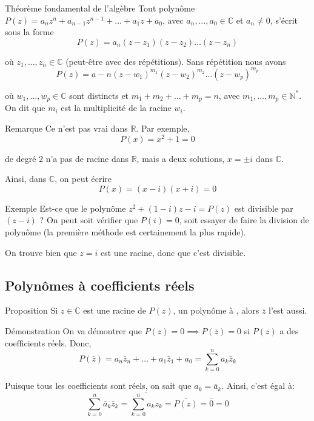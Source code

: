 \documentclass[a4paper]{article}
\begin{document}
\begin{parag}{Théorème fondamental de l'algèbre}
    Tout polynôme $P\left(z\right) = a_n z^n + a_{n - 1} z^{n-1} + \ldots + a_1 z + a_0$, avec $a_n, \ldots, a_0 \in \mathbb{C}$ et $a_n \neq 0$, s'écrit sous la forme
    \[P\left(z\right) = a_n \left(z - z_1\right)\left(z - z_2\right)\ldots\left(z - z_n\right)\]

    où $z_1, \ldots, z_n \in \mathbb{C}$ (peut-être avec des répétitions). Sans répétition nous avons
    \[P\left(z\right) = a-n \left(z - w_1\right)^{m_1} \left(z - w_2\right)^{m_2}\ldots\left(z - w_p\right)^{m_p}\]

    où $w_1, \ldots, w_p \in \mathbb{C}$ sont distincts et $m_1 + m_2 + \ldots + m_p = n$, avec $m_1, \ldots, m_p \in \mathbb{N}^*$. On dit que $m_i$ est la multiplicité de la racine $w_i$.

    \begin{subparag}{Remarque}
        Ce n'est pas vrai dans $\mathbb{R}$. Par exemple,
        \[P\left(x\right) = x^2 + 1 = 0\]

        de degré 2 n'a pas de racine dans $\mathbb{R}$, mais a deux solutions, $x = \pm i$ dans $\mathbb{C}$.

        Ainsi, dans $\mathbb{C}$, on peut écrire
        \[P\left(x\right) = \left(x - i\right)\left(x + i\right) = 0\]
    \end{subparag}
\end{parag}

\begin{parag}{Exemple}
    Est-ce que le polynôme $z^2 + \left(1- i\right)z - i = P\left(z\right)$ est divisible par $\left(z - i\right)$ ? On peut soit vérifier que $P\left(i\right) = 0$, soit essayer de faire la division de polynôme (la première méthode est certainement la plus rapide).

    On trouve bien que $z = i$ est une racine, donc que c'est divisible.
\end{parag}

\subsection{Polynômes à coefficients réels}
\begin{parag}{Proposition}
    Si $z \in \mathbb{C}$ est une racine de $P\left(z\right)$, un polynôme à , alors $\bar{z}$ l'est aussi.

    \begin{subparag}{Démonstration}
        On va démontrer que $P\left(z\right) = 0 \implies P\left(\bar{z}\right) = 0$ si $P\left(z\right)$ a des coefficients réels. Donc,
        \[P\left(\bar{z}\right) = a_n \bar{z}_n + \ldots + a_1 \bar{z}_1 + a_0 = \sum_{k=0}^{n} a_k \bar{z}_k\]

        Puisque tous les coefficients sont réels, on sait que $a_k = \bar{a}_k$. Ainsi, c'est égal à:
        \[\sum_{k=0}^{n} \bar{a}_k \bar{z}_k =  \bar{\sum_{k=0}^{n} a_k z_k} = \bar{P\left(z\right)} = \bar{0} = 0\]
    \end{subparag}
\end{parag}
\end{document}
